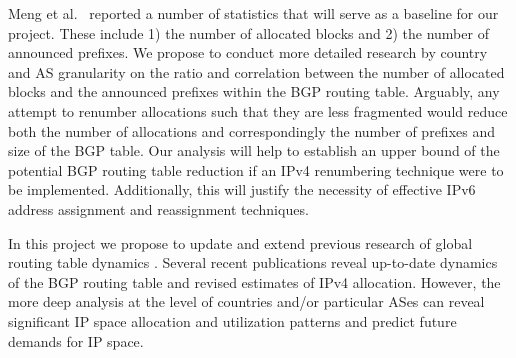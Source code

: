 \documentclass[conference]{IEEEtran}
\begin{document}
Meng et al.~\cite{Meng:2005:IPv4-address} reported a number of statistics that will serve as a baseline for our project.  These include 1) the number of allocated blocks and 2) the number of announced prefixes. We propose to conduct more detailed research by country and AS granularity on the ratio and correlation between the number of allocated blocks and the announced prefixes within the BGP routing table. Arguably, any attempt to renumber allocations such that they are less fragmented would reduce both the number of allocations and correspondingly the number of prefixes and size of the BGP table. Our analysis will help to establish an upper bound of the potential BGP routing table reduction if an IPv4 renumbering technique were to be implemented. Additionally, this will justify the necessity of effective IPv6 address assignment and reassignment techniques.

% 
% 

% 
% 



In this project we propose to update and extend previous research of global routing table dynamics \cite{Xu:2003:IPv4-Address, Meng:2003:An-analysis-of-BGP-routing, Meng:2005:IPv4-address}. Several recent publications \cite{::BGP-Reports, ::IPv4-Address-Report} reveal up-to-date dynamics of the BGP routing table and revised estimates of IPv4 allocation. However, the more deep analysis at the level of countries and/or particular ASes can reveal significant IP space allocation and utilization patterns and predict future demands for IP space.


\end{document}
